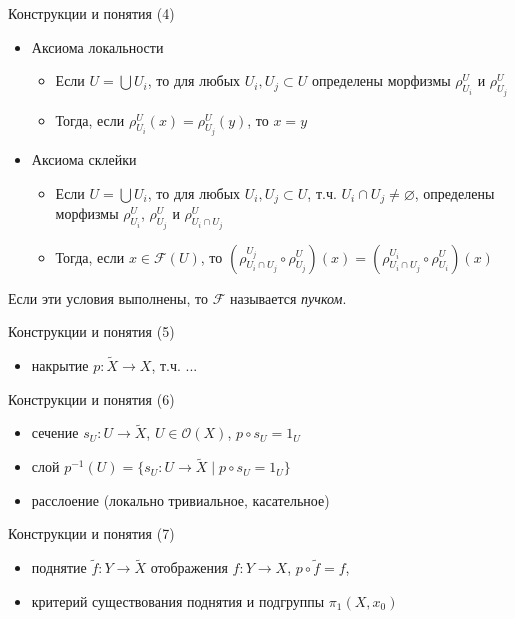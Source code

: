 \documentclass{beamer}
\begin{document}
\begin{frame}{Конструкции и понятия (4)}
\begin{itemize}
	\item Аксиома локальности
		\medskip
		\begin{itemize}
			\item Если $U = \bigcup U_i$, то для любых $U_i, U_j \subset U$ определены морфизмы $\rho^U_{U_i}$ и $\rho^U_{U_j}$
			\medskip
			\item Тогда, если $\rho^U_{U_i}(x) = \rho^U_{U_j}(y)$, то $x = y$
		\end{itemize}
	\bigskip
	\item Аксиома склейки
		\medskip
		\begin{itemize}
			\item Если $U = \bigcup U_i$, то для любых $U_i, U_j \subset U$, т.ч. $U_i \cap U_j \neq \varnothing$, определены морфизмы $\rho^U_{U_i}$, $\rho^U_{U_j}$ и $\rho^U_{U_i \cap U_j}$
			\medskip
			\item Тогда, если $x \in \mathcal{F}(U)$, то $(\rho^{U_j}_{U_i \cap U_j} \circ \rho^U_{U_j})(x) = (\rho^{U_i}_{U_i \cap U_j} \circ \rho^U_{U_i})(x)$
		\end{itemize}
\end{itemize}
\bigskip
Если эти условия выполнены, то $\mathcal{F}$ называется \textit{пучком}.
\end{frame}

\begin{frame}{Конструкции и понятия (5)}
\begin{itemize}
	\item накрытие $p : \widetilde{X} \to X$, т.ч. ...
\end{itemize}
\end{frame}

\begin{frame}{Конструкции и понятия (6)}
\begin{itemize}
	\item сечение $s_U : U \to \widetilde{X}$, $U \in \mathcal{O}(X)$, $p \circ s_U = 1_U$
    \item слой $p^{-1}(U) = \{ s_U : U \to \widetilde{X} \; \vert \; p \circ s_U = 1_U \}$
    \item расслоение (локально тривиальное, касательное)
\end{itemize}
\end{frame}

\begin{frame}{Конструкции и понятия (7)}
\begin{itemize}
	\item поднятие $\widetilde{f} : Y \to \widetilde{X}$ отображения $f : Y \to X$, $p \circ \widetilde{f} = f$, 
	\item критерий существования поднятия и подгруппы $\pi_1(X, x_0)$
\end{itemize}
\end{frame}
\end{document}
